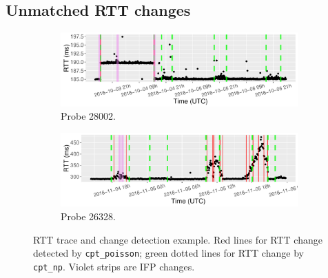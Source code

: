 \subsection{Unmatched RTT changes}

\begin{figure}[!htb]
    \centering
    \begin{subfigure}[b]{.96\textwidth}
	\centering
	\includegraphics[width=\textwidth]{gfx/chap4/case_28002.pdf}
	\caption{\footnotesize Probe 28002.}
	\label{fig:case_28002}
	\end{subfigure}
	\begin{subfigure}[b]{.96\textwidth}
	\centering
	\includegraphics[width=\textwidth]{gfx/chap4/case_26328.pdf}
	\caption{\footnotesize Probe 26328.}
	\label{fig:case_26328}
	\end{subfigure}
\caption{RTT trace and change detection example. Red lines for RTT change detected by \texttt{cpt\_poisson}; green dotted lines for RTT change by \texttt{cpt\_np}. Violet strips are IFP changes.}
\label{fig:case_sensitivity}
\end{figure}

